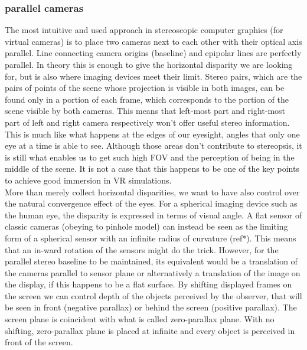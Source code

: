 \subsubsection{parallel cameras}
The most intuitive and used approach in stereoscopic computer graphics (for virtual cameras) is to place two cameras next to each other with their optical axis parallel. Line connecting camera origins (baseline) and epipolar lines are perfectly parallel. In theory this is enough to give the horizontal disparity we are looking for, but is also where imaging devices meet their limit. Stereo pairs, which are the pairs of points of the scene whose projection is visible in both images, can be found only in a portion of each frame, which corresponds to the portion of the scene visible by both cameras. This means that left-most part and right-most part of left and right camera respectively won’t offer useful stereo information. This is much like what happens at the edges of our eyesight, angles that only one eye at a time is able to see. Although those areas don’t contribute to stereopsis, it is still what enables us to get such high FOV and the perception of being in the middle of the scene. It is not a case that this happens to be one of the key points to achieve good immersion in VR simulations.\\
More than merely collect horizontal disparities, we want to have also control over the natural convergence effect of the eyes. For a spherical imaging device such as the human eye, the disparity is expressed in terms of visual angle. A flat sensor of classic cameras (obeying to pinhole model) can instead be seen as the limiting form of a spherical sensor with an infinite radius of curvature (ref*). This means that an in-ward rotation of the sensors might do the trick. However, for the parallel stereo baseline to be maintained, its equivalent would be a translation of the cameras parallel to sensor plane or alternatively a translation of the image on the display, if this happens to be a flat surface. By shifting displayed frames on the screen we can control depth of the objects perceived by the observer, that will be seen in front (negative parallax) or behind the screen (positive parallax). The screen plane is coincident with what is called zero-parallax plane. With no shifting, zero-parallax plane is placed at infinite and every object is perceived in front of the screen.\\
